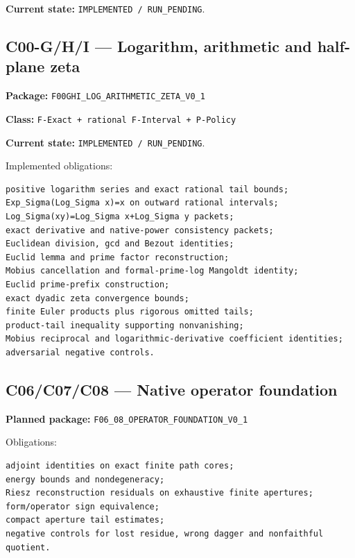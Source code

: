 \textbf{Current state:} \texttt{IMPLEMENTED\ /\ RUN\_PENDING}.

\hypertarget{c00-ghi-logarithm-arithmetic-and-half-plane-zeta}{%
\subsection{C00-G/H/I --- Logarithm, arithmetic and half-plane zeta}\label{c00-ghi-logarithm-arithmetic-and-half-plane-zeta}}

\textbf{Package:} \texttt{F00GHI\_LOG\_ARITHMETIC\_ZETA\_V0\_1}

\textbf{Class:} \texttt{F-Exact\ +\ rational\ F-Interval\ +\ P-Policy}

\textbf{Current state:} \texttt{IMPLEMENTED\ /\ RUN\_PENDING}.

Implemented obligations:

\begin{verbatim}
positive logarithm series and exact rational tail bounds;
Exp_Sigma(Log_Sigma x)=x on outward rational intervals;
Log_Sigma(xy)=Log_Sigma x+Log_Sigma y packets;
exact derivative and native-power consistency packets;
Euclidean division, gcd and Bezout identities;
Euclid lemma and prime factor reconstruction;
Mobius cancellation and formal-prime-log Mangoldt identity;
Euclid prime-prefix construction;
exact dyadic zeta convergence bounds;
finite Euler products plus rigorous omitted tails;
product-tail inequality supporting nonvanishing;
Mobius reciprocal and logarithmic-derivative coefficient identities;
adversarial negative controls.
\end{verbatim}

\hypertarget{c06c07c08-native-operator-foundation}{%
\subsection{C06/C07/C08 --- Native operator foundation}\label{c06c07c08-native-operator-foundation}}

\textbf{Planned package:} \texttt{F06\_08\_OPERATOR\_FOUNDATION\_V0\_1}

Obligations:

\begin{verbatim}
adjoint identities on exact finite path cores;
energy bounds and nondegeneracy;
Riesz reconstruction residuals on exhaustive finite apertures;
form/operator sign equivalence;
compact aperture tail estimates;
negative controls for lost residue, wrong dagger and nonfaithful quotient.
\end{verbatim}

